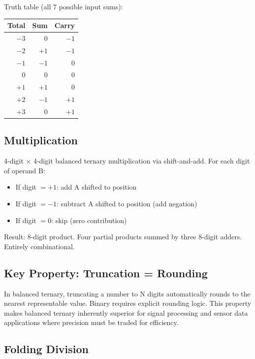 \documentclass[11pt, a4paper]{article}
\begin{document}
Truth table (all 7 possible input sums):
\begin{center}
\begin{tabular}{@{}rrr@{}}
\toprule
\textbf{Total} & \textbf{Sum} & \textbf{Carry} \\
\midrule
$-3$ & $0$ & $-1$ \\
$-2$ & $+1$ & $-1$ \\
$-1$ & $-1$ & $0$ \\
$0$  & $0$  & $0$ \\
$+1$ & $+1$ & $0$ \\
$+2$ & $-1$ & $+1$ \\
$+3$ & $0$  & $+1$ \\
\bottomrule
\end{tabular}
\end{center}

\subsection{Multiplication}

4-digit $\times$ 4-digit balanced ternary multiplication via
shift-and-add. For each digit of operand B:
\begin{itemize}[nosep]
  \item If digit $= +1$: add A shifted to position
  \item If digit $= -1$: subtract A shifted to position (add negation)
  \item If digit $= 0$: skip (zero contribution)
\end{itemize}

Result: 8-digit product. Four partial products summed by three
8-digit adders. Entirely combinational.

\subsection{Key Property: Truncation = Rounding}

In balanced ternary, truncating a number to N digits automatically
rounds to the nearest representable value. Binary requires explicit
rounding logic. This property makes balanced ternary inherently
superior for signal processing and sensor data applications where
precision must be traded for efficiency.

\subsection{Folding Division}
\end{document}
